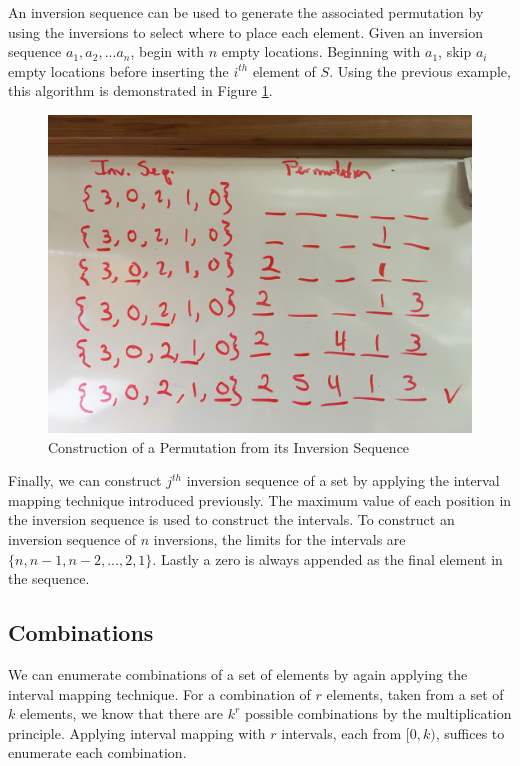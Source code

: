 An inversion sequence can be used to generate the associated permutation by using the inversions to select where to place each element. Given an inversion sequence $a_1, a_2, ... a_n$, begin with $n$ empty locations. Beginning with $a_1$, skip $a_i$ empty locations before inserting the $i^{th}$ element of $S$. Using the previous example, this algorithm is demonstrated in Figure \ref{fig:inversion_sequence}.

\begin{figure}
\centering
\centerline{\includegraphics[origin=c,width=12cm]{../figures/inv-seq.jpg}}
\caption{Construction of a Permutation from its Inversion Sequence}
\label{fig:inversion_sequence}
\end{figure}

Finally, we can construct $j^{th}$ inversion sequence of a set by applying the interval mapping technique introduced previously. The maximum value of each position in the inversion sequence is used to construct the intervals. To construct an inversion sequence of $n$ inversions, the limits for the intervals are $\{n, n - 1, n - 2, ..., 2, 1\}$. Lastly a zero is always appended as the final element in the sequence.

\subsection{Combinations}

We can enumerate combinations of a set of elements by again applying the interval mapping technique. For a combination of $r$ elements, taken from a set of $k$ elements, we know that there are $k^r$ possible combinations by the multiplication principle. Applying interval mapping with $r$ intervals, each from $[0, k)$, suffices to enumerate each combination.


